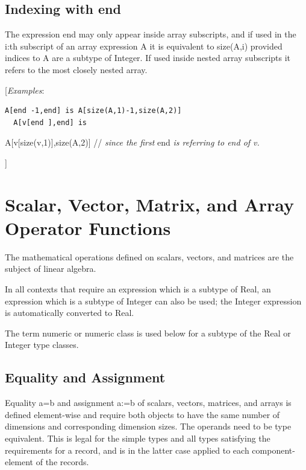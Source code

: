 \documentclass[10pt,a4paper]{report}
\def\doublelabel#1{\label{#1}\hypertarget{#1}{}}
\begin{document}
\subsection{Indexing with end}\doublelabel{indexing-with-end}

The expression end may only appear inside array subscripts, and if used
in the i:th subscript of an array expression A it is equivalent to
size(A,i) provided indices to A are a subtype of Integer. If used inside
nested array subscripts it refers to the most closely nested array.

{[}\emph{Examples}:

\begin{lstlisting}[language=modelica]
  A[end -1,end] is A[size(A,1)-1,size(A,2)]
  A[v[end ],end] is
\end{lstlisting}
A{[}v{[}size(v,1){]},size(A,2){]} // \emph{since the first} end \emph{is
referring to end of v.}

{]}

\section{Scalar, Vector, Matrix, and Array Operator Functions}\doublelabel{scalar-vector-matrix-and-array-operator-functions}

The mathematical operations defined on scalars, vectors, and matrices
are the subject of linear algebra.

In all contexts that require an expression which is a subtype of Real,
an expression which is a subtype of Integer can also be used; the
Integer expression is automatically converted to Real.

The term numeric or numeric class is used below for a subtype of the
Real or Integer type classes.

\subsection{Equality and Assignment}\doublelabel{equality-and-assignment}

Equality a=b and assignment a:=b of scalars, vectors, matrices, and
arrays is defined element-wise and require both objects to have the same
number of dimensions and corresponding dimension sizes. The operands
need to be type equivalent. This is legal for the simple types and all
types satisfying the requirements for a record, and is in the latter
case applied to each component-element of the records.
\end{document}
